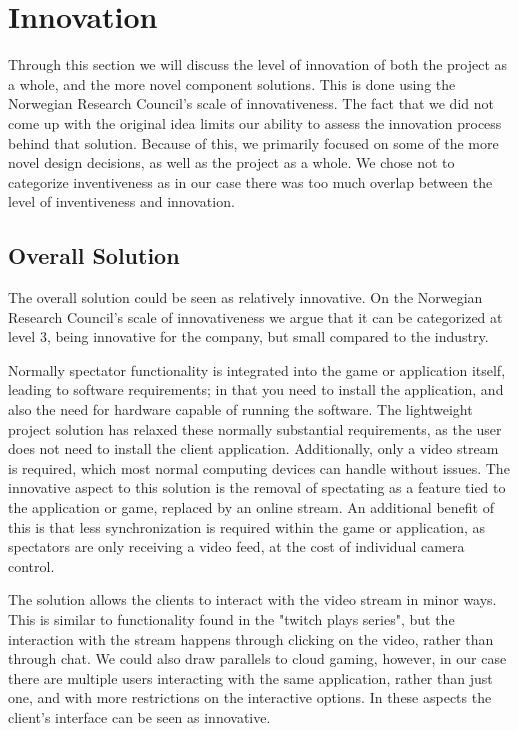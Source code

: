 \section{Innovation}
Through this section we will discuss the level of innovation of both the project as a whole, and the more novel component solutions. This is done using the Norwegian Research Council's scale of innovativeness\cite{nrcs}.
The fact that we did not come up with the original idea limits our ability to assess the innovation process behind that solution. Because of this, we primarily focused on some of the more novel design decisions, as well as the project as a whole. We chose not to categorize inventiveness as in our case there was too much overlap between the level of inventiveness and innovation.



\subsection{Overall Solution}
The overall solution could be seen as relatively innovative. On the Norwegian Research Council's\cite{nrcs} scale of innovativeness we argue that it can be categorized at level 3, being innovative for the company, but small compared to the industry.

Normally spectator functionality is integrated into the game or application itself, leading to software requirements; in that you need to install the application, and also the need for hardware capable of running the software. The lightweight project solution has relaxed these normally substantial requirements, as the user does not need to install the client application. Additionally, only a video stream is required, which most normal computing devices can handle without issues. The innovative aspect to this solution is the removal of spectating as a feature tied to the application or game, replaced by an online stream. An additional benefit of this is that less synchronization is required within the game or application, as spectators are only receiving a video feed, at the cost of individual camera control.

The solution allows the clients to interact with the video stream in minor ways. This is similar to functionality found in the "twitch plays series"\cite{twitch_plays}, but the interaction with the stream happens through clicking on the video, rather than through chat. We could also draw parallels to cloud gaming, however, in our case there are multiple users interacting with the same application, rather than just one, and with more restrictions on the interactive options. In these aspects the client's interface can be seen as innovative.

